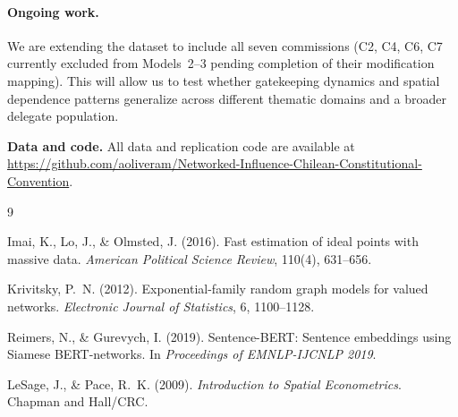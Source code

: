 \documentclass[11pt,a4paper]{article}
\begin{document}
\paragraph{Ongoing work.} We are extending the dataset to include all seven commissions (C2, C4, C6, C7 currently excluded from Models~2--3 pending completion of their modification mapping). This will allow us to test whether gatekeeping dynamics and spatial dependence patterns generalize across different thematic domains and a broader delegate population.

\bigskip

\noindent\textbf{Data and code.} All data and replication code are available at \url{https://github.com/aoliveram/Networked-Influence-Chilean-Constitutional-Convention}.


\begin{thebibliography}{9}

Imai, K., Lo, J., \& Olmsted, J. (2016).
\newblock Fast estimation of ideal points with massive data.
\newblock \emph{American Political Science Review}, 110(4), 631--656.

Krivitsky, P.~N. (2012).
\newblock Exponential-family random graph models for valued networks.
\newblock \emph{Electronic Journal of Statistics}, 6, 1100--1128.

Reimers, N., \& Gurevych, I. (2019).
\newblock Sentence-BERT: Sentence embeddings using Siamese BERT-networks.
\newblock In \emph{Proceedings of EMNLP-IJCNLP 2019}.

LeSage, J., \& Pace, R.~K. (2009).
\newblock \emph{Introduction to Spatial Econometrics}.
\newblock Chapman and Hall/CRC.

\end{thebibliography}
\end{document}
